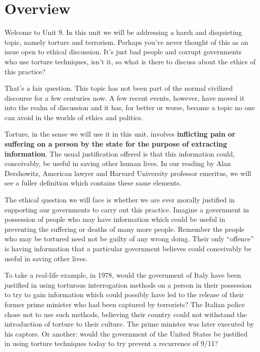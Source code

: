 \documentclass[
]{book}
\begin{document}
\hypertarget{overview-8}{%
\section*{Overview}\label{overview-8}}

Welcome to Unit 9. In this unit we will be addressing a harsh and disquieting topic, namely torture and terrorism. Perhaps you've never thought of this as an issue open to ethical discussion. It's just bad people and corrupt governments who use torture techniques, isn't it, so what is there to discuss about the ethics of this practice?

That's a fair question. This topic has not been part of the normal civilized discourse for a few centuries now. A few recent events, however, have moved it into the realm of discussion and it has, for better or worse, become a topic no one can avoid in the worlds of ethics and politics.

Torture, in the sense we will use it in this unit, involves \textbf{inflicting pain or suffering on a person by the state for the purpose of extracting information}. The usual justification offered is that this information could, conceivably, be useful in saving other human lives. In our reading by Alan Dershowitz, American lawyer and Harvard University professor emeritus, we will see a fuller definition which contains these same elements.

The ethical question we will face is whether we are ever morally justified in supporting our governments to carry out this practice. Imagine a government in possession of people who may have information which could be useful in preventing the suffering or deaths of many more people. Remember the people who may be tortured need not be guilty of any wrong doing. Their only ``offence'' is having information that a particular government believes could conceivably be useful in saving other lives.

To take a real-life example, in 1978, would the government of Italy have been justified in using torturous interrogation methods on a person in their possession to try to gain information which could possibly have led to the release of their former prime minister who had been captured by terrorists? The Italian police chose not to use such methods, believing their country could not withstand the introduction of torture to their culture. The prime minister was later executed by his captors. Or another: would the government of the United States be justified in using torture techniques today to try prevent a recurrence of 9/11?
\end{document}
